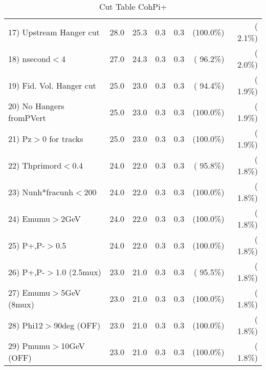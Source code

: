 \begin{table}[h!]
\begin{tabular}{||l||r|r|r|r|r|r||}
 17) Upstream Hanger cut  &         28.0 &         25.3 &          0.3 &          0.3 & (100.0\%) & (  2.1\%) \\
 18) nsecond$<$4          &         27.0 &         24.3 &          0.3 &          0.3 & ( 96.2\%) & (  2.0\%) \\
 19) Fid. Vol. Hanger cut &         25.0 &         23.0 &          0.3 &          0.3 & ( 94.4\%) & (  1.9\%) \\
 20) No Hangers fromPVert &         25.0 &         23.0 &          0.3 &          0.3 & (100.0\%) & (  1.9\%) \\
 21) Pz$>$0 for tracks    &         25.0 &         23.0 &          0.3 &          0.3 & (100.0\%) & (  1.9\%) \\
 22) Thprimord$<$0.4      &         24.0 &         22.0 &          0.3 &          0.3 & ( 95.8\%) & (  1.8\%) \\
 23) Nunh*fracunh$<$200   &         24.0 &         22.0 &          0.3 &          0.3 & (100.0\%) & (  1.8\%) \\
 24) Emumu$>$2GeV         &         24.0 &         22.0 &          0.3 &          0.3 & (100.0\%) & (  1.8\%) \\
 25) P+,P-$>$0.5          &         24.0 &         22.0 &          0.3 &          0.3 & (100.0\%) & (  1.8\%) \\
 26) P+,P-$>$1.0 (2.5mux) &         23.0 &         21.0 &          0.3 &          0.3 & ( 95.5\%) & (  1.8\%) \\
 27) Emumu$>$5GeV  (8mux) &         23.0 &         21.0 &          0.3 &          0.3 & (100.0\%) & (  1.8\%) \\
 28) Phi12$>$90deg  (OFF) &         23.0 &         21.0 &          0.3 &          0.3 & (100.0\%) & (  1.8\%) \\
 29) Pmumu$>$10GeV  (OFF) &         23.0 &         21.0 &          0.3 &          0.3 & (100.0\%) & (  1.8\%) \\
 \hline
 \hline
 \end{tabular}
 \caption{Cut Table  CohPi+   }
 \label{tab-cutcohjpsi-mumu_cohpip}
 \end{table}
